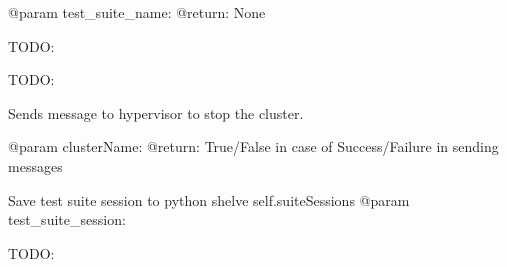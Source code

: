 \documentclass[a4paper,11pt,openany]{sphinxmanual}
\begin{document}
\begin{fulllineitems}
\begin{fulllineitems}
@param test\_suite\_name:
@return: None

\end{fulllineitems}


\begin{fulllineitems}
\label{ref-manual/XrdTestMaster:XrdTestMaster.XrdTestMaster.startTCPServer}
TODO:

\end{fulllineitems}


\begin{fulllineitems}
\label{ref-manual/XrdTestMaster:XrdTestMaster.XrdTestMaster.startWebInterface}
TODO:

\end{fulllineitems}


\begin{fulllineitems}
\label{ref-manual/XrdTestMaster:XrdTestMaster.XrdTestMaster.stopCluster}
Sends message to hypervisor to stop the cluster.

@param clusterName:
@return: True/False in case of Success/Failure in sending messages

\end{fulllineitems}


\begin{fulllineitems}
\label{ref-manual/XrdTestMaster:XrdTestMaster.XrdTestMaster.storeSuiteSession}
Save test suite session to python shelve self.suiteSessions
@param test\_suite\_session:

\end{fulllineitems}


\begin{fulllineitems}
\label{ref-manual/XrdTestMaster:XrdTestMaster.XrdTestMaster.watchDirectories}
TODO:

\end{fulllineitems}


\end{fulllineitems}
\end{document}
